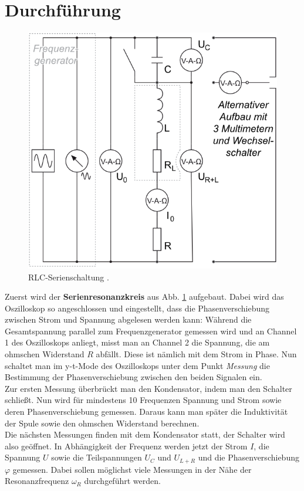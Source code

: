 \documentclass[12pt,a4paper,titlepage,headinclude,bibtotoc]{scrartcl}
\begin{document}
\section{Durchführung}
\label{sec:durchfuehrung}
\begin{figure}[!htb]
	\centering
	\includegraphics[scale=0.6]{serie.png}
	\caption{RLC-Serienschaltung \cite[Datum: 03.10.14]{LP14}.}
	\label{fig:serie}
\end{figure}

Zuerst wird der \textbf{Serienresonanzkreis} aus Abb. \ref{fig:serie} aufgebaut.
Dabei wird das Oszilloskop so angeschlossen und eingestellt, dass die Phasenverschiebung zwischen Strom und Spannung abgelesen werden kann:
Während die Gesamtspannung parallel zum Frequenzgenerator gemessen wird und an Channel 1 des Oszilloskops anliegt, misst man an Channel 2 die Spannung, die am ohmschen Widerstand $R$ abfällt.
Diese ist nämlich mit dem Strom in Phase.
Nun schaltet man im y-t-Mode des Oszilloskops unter dem Punkt \emph{Messung} die Bestimmung der Phasenverschiebung zwischen den beiden Signalen ein.\\
Zur ersten Messung überbrückt man den Kondensator, indem man den Schalter schließt.
Nun wird für mindestens 10 Frequenzen Spannung und Strom sowie deren Phasenverschiebung gemessen.
Daraus kann man später die Induktivität der Spule sowie den ohmschen Widerstand berechnen.\\
Die nächsten Messungen finden mit dem Kondensator statt, der Schalter wird also geöffnet.
In Abhängigkeit der Frequenz werden jetzt der Strom $I$, die Spannung $U$ sowie die Teilspannungen $U_C$ und $U_{L+R}$ und die Phasenverschiebung $\varphi$ gemessen.
Dabei sollen möglichst viele Messungen in der Nähe der Resonanzfrequenz $\omega_R$ durchgeführt werden.\\
\end{document}
